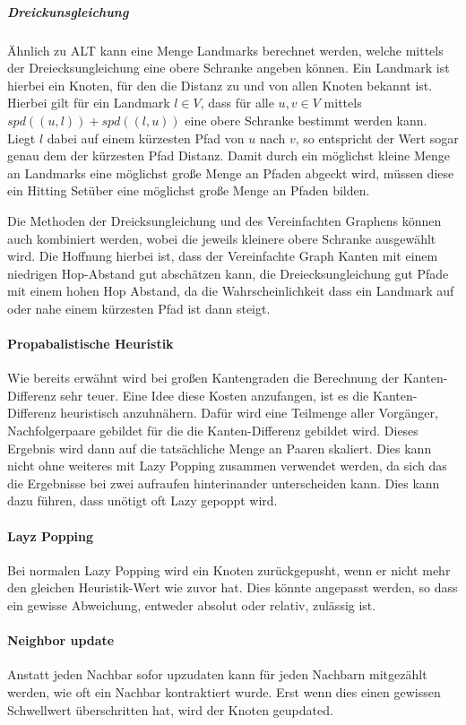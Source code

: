\subparagraph{Dreickunsgleichung}
Ähnlich zu ALT\cite{goldberg2005computing} kann eine Menge Landmarks berechnet werden, welche mittels der Dreiecksungleichung eine obere Schranke angeben können.
Ein Landmark ist hierbei ein Knoten, für den die Distanz zu und von allen Knoten bekannt ist.
Hierbei gilt für ein Landmark $l \in V$, dass für alle $u, v \in V$ mittels ${spd}((u, l)) + {spd}((l, u))$ eine obere Schranke bestimmt werden kann.
Liegt $l$ dabei auf einem kürzesten Pfad von $u$ nach $v$, so entspricht der Wert sogar genau dem der kürzesten Pfad Distanz.
Damit durch ein möglichst kleine Menge an Landmarks eine möglichst große Menge an Pfaden abgeckt wird, müssen diese ein Hitting Setüber eine möglichst große Menge an Pfaden bilden.

Die Methoden der Dreicksungleichung und des Vereinfachten Graphens können auch kombiniert werden, wobei die jeweils kleinere obere Schranke ausgewählt wird.
Die Hoffnung hierbei ist, dass der Vereinfachte Graph Kanten mit einem niedrigen Hop-Abstand gut abschätzen kann, die Dreiecksungleichung gut Pfade mit einem hohen Hop Abstand, da die Wahrscheinlichkeit dass ein Landmark auf oder nahe einem kürzesten Pfad ist dann steigt.

\paragraph{Propabalistische Heuristik}
Wie bereits erwähnt wird bei großen Kantengraden die Berechnung der Kanten-Differenz sehr teuer.
Eine Idee diese Kosten anzufangen, ist es die Kanten-Differenz heuristisch anzuhnähern.
Dafür wird eine Teilmenge aller Vorgänger, Nachfolgerpaare gebildet für die die Kanten-Differenz gebildet wird.
Dieses Ergebnis wird dann auf die tatsächliche Menge an Paaren skaliert.
Dies kann nicht ohne weiteres mit Lazy Popping zusammen verwendet werden, da sich das die Ergebnisse bei zwei aufraufen hinterinander unterscheiden kann.
Dies kann dazu führen, dass unötigt oft Lazy gepoppt wird.

\paragraph{Layz Popping}
Bei normalen Lazy Popping wird ein Knoten zurückgepusht, wenn er nicht mehr den gleichen Heuristik-Wert wie zuvor hat.
Dies könnte angepasst werden, so dass ein gewisse Abweichung, entweder absolut oder relativ, zulässig ist.

\paragraph{Neighbor update}
Anstatt jeden Nachbar sofor upzudaten kann für jeden Nachbarn mitgezählt werden, wie oft ein Nachbar kontraktiert wurde.
Erst wenn dies einen gewissen Schwellwert überschritten hat, wird der Knoten geupdated.

